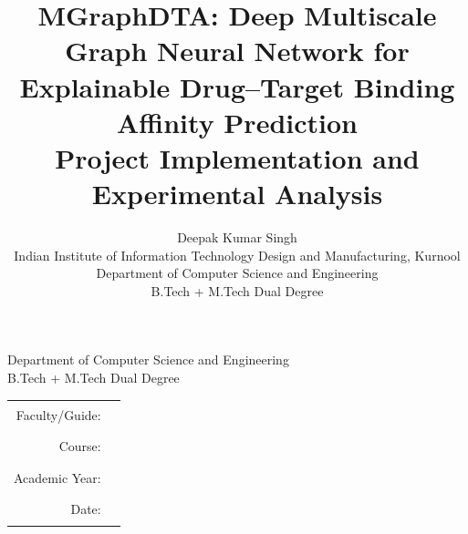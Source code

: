 \documentclass[12pt,oneside]{report}
\title{MGraphDTA: Deep Multiscale Graph Neural Network for\\Explainable Drug--Target Binding Affinity Prediction\\[6pt]\large Project Implementation and Experimental Analysis}
\author{Deepak Kumar Singh\\[4pt]\normalsize Indian Institute of Information Technology Design and Manufacturing, Kurnool\\\normalsize Department of Computer Science and Engineering\\\normalsize B.Tech + M.Tech Dual Degree}
\date{\vspace{1cm}Faculty/Guide: \rule{7cm}{0.4pt}\\[8pt]Course: \rule{8.5cm}{0.4pt}\\[8pt]Academic Year: \rule{6.6cm}{0.4pt}\\[8pt]Date: \rule{8.2cm}{0.4pt}}
\begin{document}
\begin{titlepage}\centering\vspace*{1.2cm}{\Large Indian Institute of Information Technology Design and Manufacturing, Kurnool\par}\vspace{1.7cm}{\huge\bfseries MGraphDTA:\\Deep Multiscale Graph Neural Network for\\Explainable Drug--Target Binding Affinity Prediction\par}\vspace{0.7cm}{\Large Project Implementation and Experimental Analysis\par}\vspace{1.6cm}{\large\bfseries Deepak Kumar Singh\par}\vspace{0.5cm}Department of Computer Science and Engineering\\B.Tech + M.Tech Dual Degree\vfill\begin{tabular}{rl}Faculty/Guide: & \rule{8cm}{0.4pt}\\[10pt]Course: & \rule{8cm}{0.4pt}\\[10pt]Academic Year: & \rule{8cm}{0.4pt}\\[10pt]Date: & \rule{8cm}{0.4pt}\end{tabular}\vspace{1cm}\end{titlepage}
\begin{abstract}\end{abstract}
\tableofcontents\listoffigures\listoftables\clearpage{}




\nocite{mgraphdtaauthorscode,mgraphdtaproject,rcsbpdb,pdb2hyy,pdb2itz,pdb1m17,pdb1hsg,pdb1stp}

\end{document}
